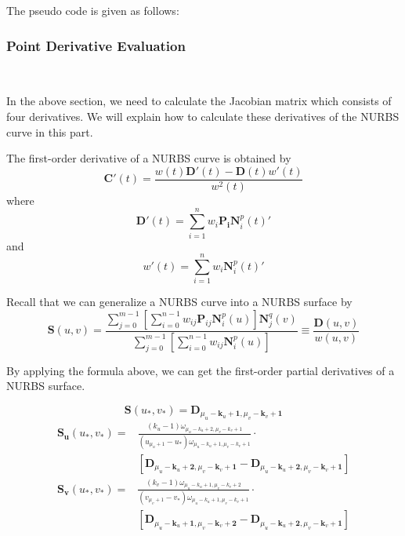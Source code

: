 \documentclass[acmtog]{acmart}
\begin{document}
The pseudo code is given as follows:  



\subsubsection{Point Derivative Evaluation}
\ 


In the above section, we need to calculate the Jacobian matrix which consists of four derivatives. We will explain how to calculate these derivatives of the NURBS curve in this part. 

The first-order derivative of a NURBS curve is obtained by \[
	\mathbf{C}'(t) = \frac{w(t) \mathbf{D}'(t) - \mathbf{D}(t)w'(t)}{w^2(t)}	
\] where \[
	\mathbf{D}'(t) = \sum_{i=1}^n w_i \mathbf{P_i} \mathbf{N}_i^p(t)'
\] and \[
	w'(t) = \sum_{i=1}^n w_i \mathbf{N}_i^p(t)'	
\] 

Recall that we can generalize a NURBS curve into a NURBS surface by
\[
	\mathbf{S}(u,v) = \frac{
		\sum_{j=0}^{m-1} \left[ \sum_{i=0}^{n-1} w_{ij} \mathbf{P}_{ij} \mathbf{N}_i^p(u) \right] \mathbf{N}_j^q(v)
	}{
		\sum_{j=0}^{m-1} \left[ \sum_{i=0}^{n-1} w_{ij} \mathbf{N}_i^p(u) \right]
	}	\equiv \frac{\mathbf{D}(u,v)}{w(u,v)}
\]

By applying the formula above, we can get the first-order partial derivatives of a NURBS surface.

\[
	\mathbf{S}(u_*, v_*) = \mathbf{D}_{\mu_u - \mathbf{k}_u + \mathbf{1}, \mu_v - \mathbf{k}_v + \mathbf{1}}	
\] 
\[\begin{aligned}
	\mathbf{S_u}(u_*, v_*) =& \frac{
		(k_u-1)\omega_{\mu_u - k_u + 2, \mu_v - k_v + 1}
	}{
		(u_{\mu_u + 1} - u_*)\omega_{\mu_u - k_u + 1, \mu_v - k_v + 1}
	}\cdot \\ &\left[
		\mathbf{D}_{\mu_u - \mathbf{k}_u + \mathbf{2}, \mu_v - \mathbf{k}_v + \mathbf{1}} - 
		\mathbf{D}_{\mu_u - \mathbf{k}_u + \mathbf{2}, \mu_v - \mathbf{k}_v + \mathbf{1}}
	\right]
\end{aligned}
\]
\[\begin{aligned}
	\mathbf{S_v}(u_*, v_*) =& \frac{
		(k_v-1)\omega_{\mu_u - k_u + 1, \mu_v - k_v + 2}
	}{
		(v_{\mu_v + 1} - v_*)\omega_{\mu_u - k_u + 1, \mu_v - k_v + 1}
	}\cdot \\ &\left[
		\mathbf{D}_{\mu_u - \mathbf{k}_u + \mathbf{1}, \mu_v - \mathbf{k}_v + \mathbf{2}} - 
		\mathbf{D}_{\mu_u - \mathbf{k}_u + \mathbf{2}, \mu_v - \mathbf{k}_v + \mathbf{1}}
	\right]
\end{aligned}
\]
\end{document}
